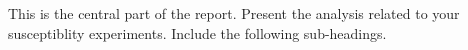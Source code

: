 This is the central part of the report. Present the analysis related to your susceptiblity experiments. Include the following sub-headings.